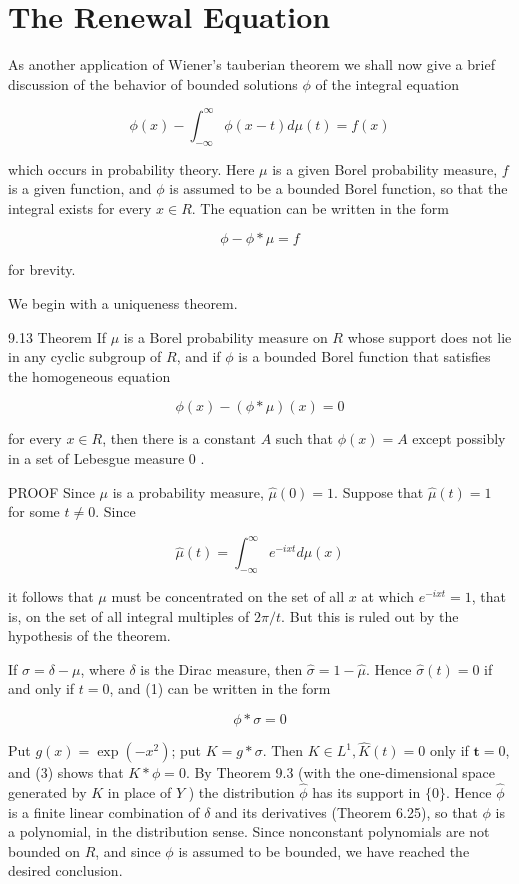 \documentclass[10pt]{article}
\begin{document}
\section{The Renewal Equation}
As another application of Wiener's tauberian theorem we shall now give a brief discussion of the behavior of bounded solutions $\phi$ of the integral equation

$$
\phi(x)-\int_{-\infty}^{\infty} \phi(x-t) d \mu(t)=f(x)
$$

which occurs in probability theory. Here $\mu$ is a given Borel probability measure, $f$ is a given function, and $\phi$ is assumed to be a bounded Borel function, so that the integral exists for every $x \in R$. The equation can be written in the form

$$
\phi-\phi * \mu=f
$$

for brevity.

We begin with a uniqueness theorem.

9.13 Theorem If $\mu$ is a Borel probability measure on $R$ whose support does not lie in any cyclic subgroup of $R$, and if $\phi$ is a bounded Borel function that satisfies the homogeneous equation

$$
\phi(x)-(\phi * \mu)(x)=0
$$

for every $x \in R$, then there is a constant $A$ such that $\phi(x)=A$ except possibly in a set of Lebesgue measure 0 .

PROOF Since $\mu$ is a probability measure, $\hat{\mu}(0)=1$. Suppose that $\hat{\mu}(t)=1$ for some $t \neq 0$. Since

$$
\hat{\mu}(t)=\int_{-\infty}^{\infty} e^{-i x t} d \mu(x)
$$

it follows that $\mu$ must be concentrated on the set of all $x$ at which $e^{-i x t}=1$, that is, on the set of all integral multiples of $2 \pi / t$. But this is ruled out by the hypothesis of the theorem.

If $\sigma=\delta-\mu$, where $\delta$ is the Dirac measure, then $\hat{\sigma}=1-\hat{\mu}$. Hence $\hat{\sigma}(t)=0$ if and only if $t=0$, and (1) can be written in the form

$$
\phi * \sigma=0
$$

Put $g(x)=\exp \left(-x^{2}\right)$; put $K=g * \sigma$. Then $K \in L^{1}, \hat{K}(t)=0$ only if $\boldsymbol{t}=0$, and (3) shows that $K * \phi=0$. By Theorem 9.3 (with the one-dimensional space generated by $K$ in place of $Y$ ) the distribution $\hat{\phi}$ has its support in $\{0\}$. Hence $\hat{\phi}$ is a finite linear combination of $\delta$ and its derivatives (Theorem 6.25), so that $\phi$ is a polynomial, in the distribution sense. Since nonconstant polynomials are not bounded on $R$, and since $\phi$ is assumed to be bounded, we have reached the desired conclusion.
\end{document}
